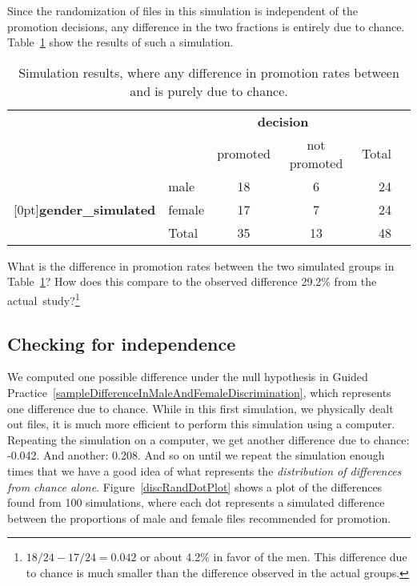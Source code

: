 Since the randomization of files in this simulation is independent of the promotion decisions, any difference in the two fractions is entirely due to chance. Table~\ref{discriminationRand1} show the results of such a simulation.

\begin{table}[ht]
\centering
\begin{tabular}{l l cc rr}
& & \multicolumn{2}{c}{\textbf{decision}} \\
  \cline{3-4}
		&			& 	{promoted} 	& {not promoted} & Total & \hspace{3mm}  \\ 
  \cline{2-5}
		&	male 					& 18    		& 6    & 24 	 \\ 
  \raisebox{1.5ex}[0pt]{\textbf{gender\_\hspace{0.3mm}simulated}}		&	female 	& 17    		& 7 & 24    	 \\ 
  \cline{2-5}
  & Total	& 35 & 13 & 48
\end{tabular}
\caption{Simulation results, where any difference in promotion rates between  and  is purely due to chance.}
\label{discriminationRand1}
\end{table}

\textPE{\pagebreak}

\begin{exercise} \label{sampleDifferenceInMaleAndFemaleDiscrimination}
What is the difference in promotion rates between the two simulated groups in Table~\ref{discriminationRand1}? How does this compare to the observed difference 29.2\% from the actual~study?\footnote{$18/24 - 17/24=0.042$ or about 4.2\% in favor of the men. This difference due to chance is much smaller than the difference observed in the actual groups.}
\end{exercise}

\subsection{Checking for independence}

We computed one possible difference under the null hypothesis in Guided Practice~\ref{sampleDifferenceInMaleAndFemaleDiscrimination}, which represents one difference due to chance. While in this first simulation, we physically dealt out files, it is much more efficient to perform this simulation using a computer. Repeating the simulation on a computer, we get another difference due to chance: -0.042. And another: 0.208. And so on until we repeat the simulation enough times that we have a good idea of what represents the \emph{distribution of differences from chance alone}. Figure~\ref{discRandDotPlot} shows a plot of the differences found from 100 simulations, where each dot represents a simulated difference between the proportions of male and female files recommended for promotion.

